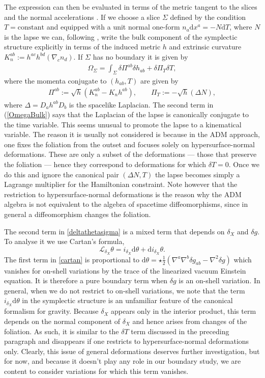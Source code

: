 \documentclass[a4paper,11pt]{article}
\newcommand{\beq}{\begin{eqnarray}}
\newcommand{\eeq}{\end{eqnarray}}
\def\rd{\mathrm{d}}
\begin{document}
The expression can then be evaluated in terms of the metric tangent to the slices and the normal accelerations \cite{Hawking:1998jf,Brown:2000dz, Freidel:2013jfa}. 
If we choose a slice $\Sigma$ defined by the condition $T= \text{constant}$ and equipped with a unit normal one-form $n_a \rd x^a = -N \rd T$, where $N$ is the lapse we can, following \cite{Freidel:2013jfa}, write the bulk component of the symplectic structure explicitly in terms of the induced metric $h$ and extrinsic curvature $K_n^{a b} := h^{ac} h^{bd} (\nabla_c n_d) $. 
If $\Sigma$ has no boundary it is given by 
\beq\label{OmegaBulk}
\Omega_\Sigma =
\int_\Sigma \delta \Pi^{ab} \delta h_{ab} + \delta \Pi_T \delta T,
\eeq
where the momenta conjugate to $(h_{ab}, T)$ are given by 
\beq\label{pi}
\Pi^{ab}:= \sqrt{h}\left(K_n^{ab}- K_{n} h^{ab}\right),\qquad 
\Pi_T := -\sqrt{h}\left(\Delta N \right),
\eeq
where $\Delta = D_a h^{ab} D_b$ is the spacelike Laplacian.
The second term in (\ref{OmegaBulk}) 
says that the Laplacian of the lapse is canonically conjugate to the time variable. This seems unusual to promote the lapse to a kinematical variable.
The reason it is usually not considered is because in the ADM approach, one fixes the foliation from the outset and focuses solely on hypersurface-normal deformations.
These are only a  subset of the deformations --- those that preserve the foliation --- hence they correspond to deformations for which $\delta T=0$.
Once we do this and ignore the canonical pair $(\Delta N , T)$ the lapse becomes simply a  Lagrange multiplier for the Hamiltonian constraint. 
Note however that the restriction to hypersurface-normal deformations is the reason why the ADM algebra is not equivalent to the algebra of spacetime diffeomorphisms, since in general a diffeomorphism changes the foliation.


The second term in \eqref{deltathetasigma} is a mixed term that depends on $\delta_X$ and $\delta g$. To analyse it we use Cartan's formula,
\begin{equation} \label{cartan}
\mathcal{L}_{\delta_X} \theta = i_{\delta_X} \rd \theta + \rd i_{\delta_X} \theta.
\end{equation}
The first term in \eqref{cartan} is proportional to $\rd \theta = \star \frac12(\nabla^a \nabla^b \delta g_{ab} - \nabla^2 \delta g)$ which vanishes for on-shell variations by the trace of the linearized vacuum Einstein equation.
It is therefore  a pure boundary term when $\delta g$ is an on-shell variation.
In general, when we do not restrict to on-shell variations,  we note that the term $i_{\delta_X} \rd \theta$ in the symplectic structure is an unfamiliar feature of the canonical formalism for gravity. Because $\delta_X$ appears only in the interior product, this term depends on the normal component of $\delta_X$ and hence arises from changes of the foliation. 
As such, it is similar to the $\delta T$ term discussed in the preceding paragraph and disappears if one restricts to hypersurface-normal deformations only.
Clearly, this issue of general deformations deserves further investigation, but for now, and because it doesn't play any role in our boundary study, we are content to consider variations for which this term vanishes.
\end{document}
